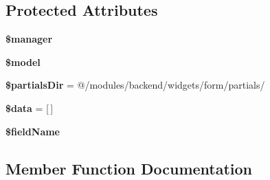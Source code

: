 \subsection*{Protected Attributes}
\begin{DoxyCompactItemize}
\item 
\hypertarget{classDMA_1_1Friends_1_1Classes_1_1ActivityForm_a6625f7f805756ad348523c8efc7eaba2}{}{\bfseries \$manager}\label{classDMA_1_1Friends_1_1Classes_1_1ActivityForm_a6625f7f805756ad348523c8efc7eaba2}

\item 
\hypertarget{classDMA_1_1Friends_1_1Classes_1_1ActivityForm_afa057e497b595e91ff28b7d82d453a19}{}{\bfseries \$model}\label{classDMA_1_1Friends_1_1Classes_1_1ActivityForm_afa057e497b595e91ff28b7d82d453a19}

\item 
\hypertarget{classDMA_1_1Friends_1_1Classes_1_1ActivityForm_a661164febcd7fafdb40b95f4fceb0539}{}{\bfseries \$partials\+Dir} = \textquotesingle{}@/modules/backend/widgets/form/partials/\textquotesingle{}\label{classDMA_1_1Friends_1_1Classes_1_1ActivityForm_a661164febcd7fafdb40b95f4fceb0539}

\item 
\hypertarget{classDMA_1_1Friends_1_1Classes_1_1ActivityForm_a7bba50ae9e6c7fe7fd5cbaa8dcf7a976}{}{\bfseries \$data} = \mbox{[}$\,$\mbox{]}\label{classDMA_1_1Friends_1_1Classes_1_1ActivityForm_a7bba50ae9e6c7fe7fd5cbaa8dcf7a976}

\item 
\hypertarget{classDMA_1_1Friends_1_1Classes_1_1ActivityForm_ae59dff70c79843060bc487578fae0846}{}{\bfseries \$field\+Name}\label{classDMA_1_1Friends_1_1Classes_1_1ActivityForm_ae59dff70c79843060bc487578fae0846}

\end{DoxyCompactItemize}


\subsection{Member Function Documentation}
\hypertarget{classDMA_1_1Friends_1_1Classes_1_1ActivityForm_ae7e6de46fdaa48ef75743de550e0c87b}{}
